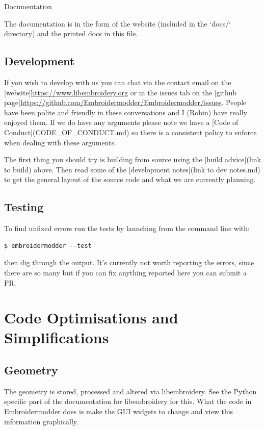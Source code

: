 Documentation

The documentation is in the form of the website (included in the `docs/`
directory) and the printed docs in this file.

\subsection{Development}

If you wish to develop with us you can chat via the contact email
on the [website]\url{https://www.libembroidery.org} or in the issues tab on the
[github page]\url{https://github.com/Embroidermodder/Embroidermodder/issues}.
People have been polite and friendly in these conversations and I (Robin)
have really enjoyed them.
If we do have any arguments please note we have a
[Code of Conduct](CODE\_OF\_CONDUCT.md) so there is a consistent policy to
enforce when dealing with these arguments.

The first thing you should try is building from source using the [build advice](link to build)
above. Then read some of the [development notes](link to dev notes.md) to get the general
layout of the source code and what we are currently planning.

\subsection{Testing}

To find unfixed errors run the tests by launching from the command line with:

\begin{lstlisting}
$ embroidermodder --test
\end{lstlisting}

then dig through the output. It's currently not worth reporting the errors, since
there are so many but if you can fix anything reported here you can submit a PR.

\section{Code Optimisations and Simplifications}

\subsection{Geometry}

The geometry is stored, processed and altered via libembroidery. See the Python specific part of the documentation for libembroidery for this. What the code in Embroidermodder does is make the GUI widgets to change and view this information graphically.

